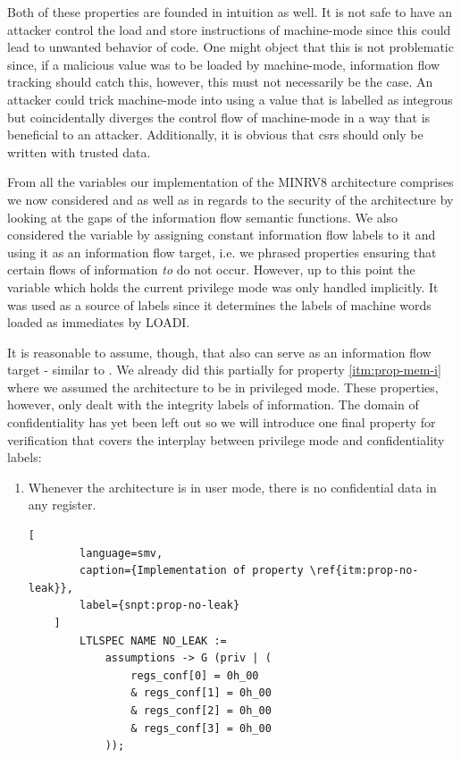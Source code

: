 Both of these properties are founded in intuition as well.
It is not safe to have an attacker control the load and store instructions of machine-mode since this could lead to unwanted behavior of code.
One might object that this is not problematic since, if a malicious value was to be loaded by machine-mode, information flow tracking should catch this, however, this must not necessarily be the case.
An attacker could trick machine-mode into using a value that is labelled as integrous but coincidentally diverges the control flow of machine-mode in a way that is beneficial to an attacker.
Additionally, it is obvious that \glspl{csr} should only be written with trusted data.

From all the variables our implementation of the MINRV8 architecture comprises we now considered  and  as well as  in regards to the security of the architecture by looking at the gaps of the information flow semantic functions.
We also considered the variable  by assigning constant information flow labels to it and using it as an information flow target, i.e. we phrased properties ensuring that certain flows of information \textit{to}  do not occur.
However, up to this point the  variable which holds the current privilege mode was only handled implicitly.
It was used as a source of labels since it determines the labels of machine words loaded as immediates by LOADI.

It is reasonable to assume, though, that  also can serve as an information flow target - similar to .
We already did this partially for property \ref{itm:prop-mem-i} where we assumed the architecture to be in privileged mode.
These properties, however, only dealt with the integrity labels of information.
The domain of confidentiality has yet been left out so we will introduce one final property for verification that covers the interplay between privilege mode and confidentiality labels:
\begin{enumerate}[label=\Roman*.,resume]
    \item \label{itm:prop-no-leak}
    Whenever the architecture is in user mode, there is no confidential data in any register.

    \begin{lstlisting}[
        language=smv,
        caption={Implementation of property \ref{itm:prop-no-leak}},
        label={snpt:prop-no-leak}
    ]
        LTLSPEC NAME NO_LEAK :=
            assumptions -> G (priv | (
                regs_conf[0] = 0h_00
                & regs_conf[1] = 0h_00
                & regs_conf[2] = 0h_00
                & regs_conf[3] = 0h_00
            ));
    \end{lstlisting}
\end{enumerate}

